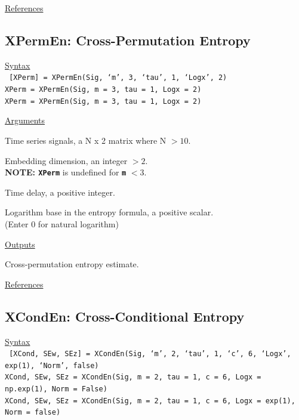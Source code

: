 \documentclass[12pt, a4paper, titlepage, openany]{book}
\begin{document}
\noindent \ul{References}\hspace{1cm}
\cite{Matt1}



\newpage
\subsection{\normalsize XPermEn: \hspace{15mm} Cross-Permutation Entropy}
\noindent\ul{Syntax} \vspace{6mm} \\ \noindent \texttt{\footnotesize
[XPerm] = XPermEn(Sig, ‘m’, 3, ‘tau’, 1, ‘Logx’, 2)\\
 XPerm  = XPermEn(Sig, m = 3, tau = 1, Logx = 2)\\
 XPerm  = XPermEn(Sig, m = 3, tau = 1, Logx = 2)}

\noindent \ul{Arguments}
\begin{description}[labelsep=1cm, labelwidth=2cm, nosep,,style=multiline,leftmargin=3cm]\footnotesize
\item[\texttt{Sig}]		Time series signals, a N x 2 matrix where N $> 10$.
\item[\texttt{m}]		Embedding dimension, an integer $> 2$.\\
\textbf{NOTE: \texttt{XPerm}} is undefined for \texttt{\textbf{m}} $< 3$.
\item[\texttt{tau}]		Time delay, a positive integer.
\item[\texttt{Logx}]	Logarithm base in the entropy formula, a positive scalar.\\
(Enter 0 for natural logarithm)
\end{description}

\noindent \ul{Outputs}
\begin{description}[labelsep=1cm, labelwidth=2cm, nosep, style=multiline,leftmargin=3cm]\footnotesize
\item[\texttt{XPerm}]		Cross-permutation entropy estimate.\\
\end{description}

\noindent \ul{References}\hspace{1cm}
\cite{XPerm1}



\newpage
\subsection{\normalsize XCondEn: \hspace{15mm} Cross-Conditional Entropy}
\noindent\ul{Syntax} \vspace{6mm} \\ \noindent \texttt{\footnotesize
[XCond, SEw, SEz] = XCondEn(Sig, ‘m’, 2, ‘tau’, 1, ‘c’, 6, ‘Logx’, exp(1), ‘Norm’, false)\\
XCond, SEw, SEz  = XCondEn(Sig, m = 2, tau = 1, c = 6, Logx = np.exp(1), Norm = False) \\
XCond, SEw, SEz  = XCondEn(Sig, m = 2, tau = 1, c = 6, Logx = exp(1), Norm = false)}
\end{document}
